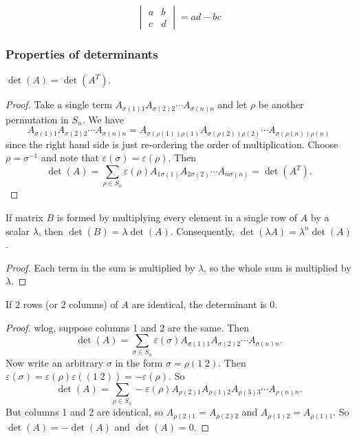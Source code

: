\documentclass[a4paper]{article}
\begin{document}
\begin{prop}
  \[
    \begin{vmatrix}
      a & b\\
      c & d
    \end{vmatrix} = ad - bc
  \]
\end{prop}

\subsubsection{Properties of determinants}
\begin{prop}
  $\det (A) = \det (A^T)$.
\end{prop}

\begin{proof}
  Take a single term $A_{\sigma(1)1}A_{\sigma(2)2}\cdots A_{\sigma(n)n}$ and let $\rho$ be another permutation in $S_n$. We have
  \[
    A_{\sigma(1)1}A_{\sigma(2)2}\cdots A_{\sigma(n)n} = A_{\sigma(\rho(1))\rho(1)}A_{\sigma(\rho(2))\rho(2)}\cdots A_{\sigma(\rho(n))\rho(n)}
  \]
  since the right hand side is just re-ordering the order of multiplication. Choose $\rho = \sigma^{-1}$ and note that $\varepsilon(\sigma) = \varepsilon(\rho)$. Then
  \[
    \det(A) = \sum_{\rho\in S_n} \varepsilon(\rho) A_{1\sigma(1)}A_{2\sigma(2)}\cdots A_{n\sigma(n)} = \det (A^T).
  \]
\end{proof}

\begin{prop}
  If matrix $B$ is formed by multiplying every element in a single row of $A$ by a scalar $\lambda$, then $\det (B) = \lambda \det (A)$. Consequently, $\det (\lambda A) = \lambda^n \det(A)$.
\end{prop}

\begin{proof}
  Each term in the sum is multiplied by $\lambda$, so the whole sum is multiplied by $\lambda$.
\end{proof}

\begin{prop}
  If 2 rows (or 2 columns) of $A$ are identical, the determinant is $0$.
\end{prop}

\begin{proof}
  wlog, suppose columns 1 and 2 are the same. Then
  \[
    \det (A) = \sum_{\sigma\in S_n} \varepsilon(\sigma) A_{\sigma(1)1}A_{\sigma(2)2}\cdots A_{\sigma(n)n}.
  \]
  Now write an arbitrary $\sigma$ in the form $\sigma = \rho(1\; 2)$. Then $\varepsilon(\sigma) = \varepsilon(\rho)\varepsilon((1\; 2)) = -\varepsilon(\rho)$. So
  \[
    \det (A) = \sum_{\rho\in S_n} -\varepsilon(\rho) A_{\rho(2)1}A_{\rho(1)2}A_{\rho(3)3}\cdots A_{\rho(n)n}.
  \]
  But columns 1 and 2 are identical, so $A_{\rho(2)1} = A_{\rho(2)2}$ and $A_{\rho(1)2} = A_{\rho(1)1}$. So $\det (A) = -\det (A)$ and $\det(A) = 0$.
\end{proof}
\end{document}
